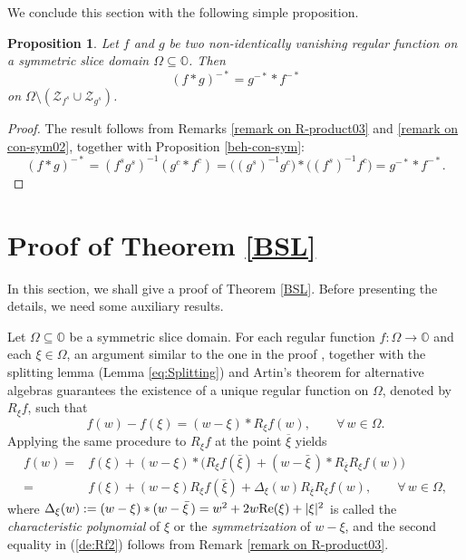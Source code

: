 \documentclass{amsart}
\newtheorem{proposition}[theorem]{Proposition}
\theoremstyle{definition}
\theoremstyle{remark}
\numberwithin{equation}{section}
\begin{document}
We conclude this section with the following simple proposition.
\begin{proposition}
Let $f$ and $g$  be two non-identically vanishing regular function on  a symmetric slice domain $\Omega\subseteq \mathbb O$. Then
$$(f\ast g)^{-\ast}=g^{-\ast}\ast f^{-\ast}$$
on $\Omega\setminus (\mathcal{Z}_{f^s}\cup \mathcal{Z}_{g^s})$.
\end{proposition}

\begin{proof}
The result follows from Remarks \ref{remark on R-product03} and \ref{remark on con-sym02}, together with Proposition \ref{beh-con-sym}:
$$(f\ast g)^{-\ast}=(f^sg^s)^{-1}(g^c\ast f^c)
=\big((g^s)^{-1}g^c\big)\ast\big((f^s)^{-1}f^c\big)=g^{-\ast}\ast f^{-\ast}.$$
\end{proof}

\section{Proof of Theorem \ref{BSL}}
In this section, we shall give a proof of Theorem \ref{BSL}. Before presenting the details, we need some auxiliary results.

Let $\Omega\subseteq\mathbb O$ be a symmetric slice domain. For each regular function $f:\Omega\rightarrow \mathbb O$ and each $\xi\in\Omega$, an argument similar to the one in the proof \cite[Proposition 3.17]{GSS}, together with the splitting lemma (Lemma \ref{eq:Splitting}) and Artin's theorem for alternative algebras guarantees  the existence of a unique regular function on $\Omega$, denoted by $R_{\xi}f$, such that
\begin{equation}\label{de:Rf1}
f(w)-f(\xi)=(w-\xi)\ast R_{\xi}f(w), \qquad \forall \, w\in\Omega.
\end{equation}
Applying the same procedure to $R_{\xi}f$ at the point $\overline{\xi}$ yields
\begin{equation}\label{de:Rf2}
\begin{split}
f(w)=&f(\xi)+(w-\xi)\ast \Big(R_{\xi}f(\bar{\xi})+(w-\bar{\xi}\,)\ast R_{\overline{\xi}}R_{\xi}f(w)\Big) \\
=&f(\xi)+(w-\xi)R_{\xi}f(\bar{\xi})+\Delta_{\xi}(w)R_{\overline{\xi}}R_{\xi}f(w), \qquad \forall \, w\in\Omega,
\end{split}
\end{equation}
where $\Delta_{\xi}(w):=(w-\xi)\ast(w-\bar{\xi}\,)=w^2+2w{\rm{Re}}(\xi)+|\xi|^2$ is called the \textit{characteristic polynomial} of $\xi$ or the \textit{symmetrization} of $w-\xi$, and the second equality in (\ref{de:Rf2}) follows from Remark \ref{remark on R-product03}.
\end{document}
